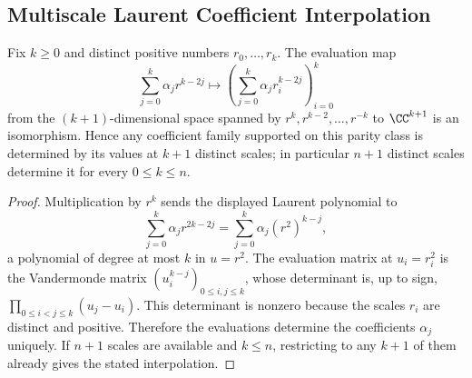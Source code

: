 \subsection{Multiscale Laurent Coefficient Interpolation}\label{subsec:multiscale-coefficient-vector-inverse}

\begin{lemma}\label{lem:parity-restricted-laurent-interpolation}
Fix \(k\ge0\) and distinct positive numbers \(r_0,
\dots,r_k\).  The evaluation map
\[
\sum_{j=0}^{k}\alpha_j r^{k-2j}
\longmapsto
\left(\sum_{j=0}^{k}\alpha_j r_i^{k-2j}\right)_{i=0}^{k}
\]
from the \((k+1)\)-dimensional space spanned by \(r^k,r^{k-2},\dots,r^{-k}\) to \(\CC^{k+1}\) is an isomorphism.  Hence any coefficient family supported on this parity class is determined by its values at \(k+1\) distinct scales; in particular \(n+1\) distinct scales determine it for every \(0\le k\le n\).
\end{lemma}

\begin{proof}
Multiplication by \(r^k\) sends the displayed Laurent polynomial to
\[
\sum_{j=0}^{k}\alpha_j r^{2k-2j}
=\sum_{j=0}^{k}\alpha_j (r^2)^{k-j},
\]
a polynomial of degree at most \(k\) in \(u=r^2\).  The evaluation matrix at \(u_i=r_i^2\) is the Vandermonde matrix \((u_i^{k-j})_{0\le i,j\le k}\), whose determinant is, up to sign, \(\prod_{0\le i<j\le k}(u_j-u_i)\).  This determinant is nonzero because the scales \(r_i\) are distinct and positive.  Therefore the evaluations determine the coefficients \(\alpha_j\) uniquely.  If \(n+1\) scales are available and \(k\le n\), restricting to any \(k+1\) of them already gives the stated interpolation.
\end{proof}

